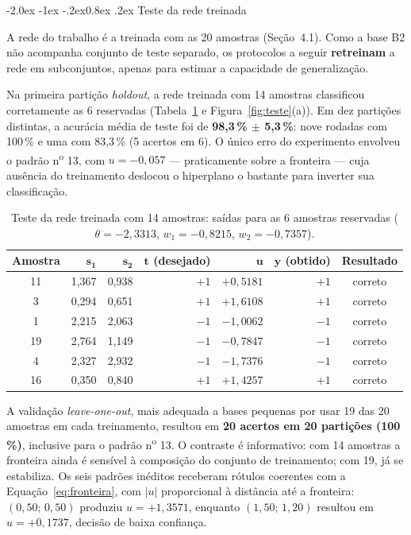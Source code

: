 \documentclass[12pt,a4paper]{article}
\makeatletter
\renewcommand\subsection{\@startsection{subsection}{2}{\z@}%
  {-2.0ex \@plus -1ex \@minus -.2ex}{0.8ex \@plus .2ex}%
  {\normalfont\normalsize\bfseries}}
\makeatother
\begin{document}
\subsection{Teste da rede treinada}

A rede do trabalho \'e a treinada com as 20 amostras (Se\c{c}\~ao~4.1). Como a
base B2 n\~ao acompanha conjunto de teste separado, os protocolos a seguir
\textbf{retreinam} a rede em subconjuntos, apenas para estimar a capacidade de
generaliza\c{c}\~ao.

Na primeira parti\c{c}\~ao \textit{holdout}, a rede treinada com 14 amostras
classificou corretamente as 6 reservadas (Tabela~\ref{tab:teste} e
Figura~\ref{fig:teste}(a)). Em dez parti\c{c}\~oes distintas, a acur\'acia m\'edia
de teste foi de \textbf{98,3\,\% $\pm$ 5,3\,\%}: nove rodadas com 100\,\% e uma com
83,3\,\% (5 acertos em 6). O \'unico erro do experimento envolveu o padr\~ao
n\textsuperscript{o} 13, com $u = -0{,}057$ --- praticamente sobre a fronteira ---
cuja aus\^encia do treinamento deslocou o hiperplano o bastante para inverter sua
classifica\c{c}\~ao.

\begin{table}[H]
\centering
\caption{Teste da rede treinada com 14 amostras: sa\'idas para as 6 amostras
reservadas ($\theta = -2{,}3313$, $w_1 = -0{,}8215$, $w_2 = -0{,}7357$).}
\label{tab:teste}
{\small\singlespacing
\begin{tabular}{@{}crrrrrc@{}}
\toprule
\textbf{Amostra} & $\mathbf{s_1}$ & $\mathbf{s_2}$ & $\mathbf{t}$ \textbf{(desejado)}
& $\mathbf{u}$ & $\mathbf{y}$ \textbf{(obtido)} & \textbf{Resultado} \\
\midrule
11 & 1,367 & 0,938 & $+1$ & $+0{,}5181$ & $+1$ & correto \\
3  & 0,294 & 0,651 & $+1$ & $+1{,}6108$ & $+1$ & correto \\
1  & 2,215 & 2,063 & $-1$ & $-1{,}0062$ & $-1$ & correto \\
19 & 2,764 & 1,149 & $-1$ & $-0{,}7847$ & $-1$ & correto \\
4  & 2,327 & 2,932 & $-1$ & $-1{,}7376$ & $-1$ & correto \\
16 & 0,350 & 0,840 & $+1$ & $+1{,}4257$ & $+1$ & correto \\
\bottomrule
\end{tabular}}
\end{table}

A valida\c{c}\~ao \textit{leave-one-out}, mais adequada a bases pequenas por usar
19 das 20 amostras em cada treinamento, resultou em \textbf{20 acertos em 20
parti\c{c}\~oes (100\,\%)}, inclusive para o padr\~ao n\textsuperscript{o} 13. O
contraste \'e informativo: com 14 amostras a fronteira ainda \'e sens\'ivel \`a
composi\c{c}\~ao do conjunto de treinamento; com 19, j\'a se estabiliza. Os seis
padr\~oes in\'editos receberam r\'otulos coerentes com a
Equa\c{c}\~ao~\ref{eq:fronteira}, com $|u|$ proporcional \`a dist\^ancia at\'e a
fronteira: $(0{,}50;\,0{,}50)$ produziu $u = +1{,}3571$, enquanto
$(1{,}50;\,1{,}20)$ resultou em $u = +0{,}1737$, decis\~ao de baixa
confian\c{c}a.
\end{document}
